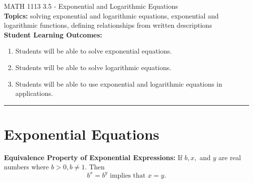 \documentclass[11pt]{article}
\begin{document}
\noindent MATH 1113   \hfill 3.5 - Exponential and Logarithmic Equations\\



\noindent \textbf{Topics:}  solving exponential and logarithmic equations, exponential and logarithmic functions, defining relationships from written descriptions\\

\noindent \textbf{Student Learning Outcomes:}
\begin{enumerate}
\item Students will be able to solve exponential equations.
\item Students will be able to solve logarithmic equations.
\item Students will be able to use exponential and logarithmic equations in applications.
\end{enumerate}

\hrule 
\vspace{5mm}
\section{Exponential Equations}


\noindent \textbf{Equivalence Property of Exponential Expressions:} If $b, x,$ and $y$ are real numbers where $b>0, b \neq 1.$  Then $$b^x=b^y \text{ implies that } x=y.$$   
\end{document}

